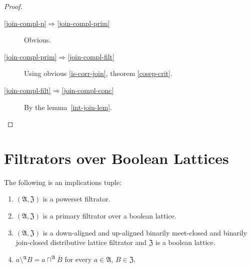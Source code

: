 \begin{proof}
~
\begin{description}
\item [{\ref{join-compl-p}$\Rightarrow$\ref{join-compl-prim}}] Obvious.
\item [{\ref{join-compl-prim}$\Rightarrow$\ref{join-compl-filt}}] Using
obvious \ref{is-corr-join}, theorem \ref{cosep-crit}.
\item [{\ref{join-compl-filt}$\Rightarrow$\ref{join-compl-conc}}] By
the lemma~\ref{int-join-lem}.
\end{description}
\end{proof}

\section{Filtrators over Boolean Lattices}
\begin{prop}
\label{b-bool-minus}The following is an implications tuple:
\begin{enumerate}
\item \label{bool-minus-p}$(\mathfrak{A},\mathfrak{Z})$ is a powerset
filtrator.
\item \label{bool-minus-f}$(\mathfrak{A},\mathfrak{Z})$ is a primary filtrator
over a boolean lattice.
\item \label{bool-minus-fltr}$(\mathfrak{A},\mathfrak{Z})$ is a down-aligned
and up-aligned binarily meet-closed and binarily join-closed distributive
lattice filtrator and $\mathfrak{Z}$ is a boolean lattice.
\item \label{bool-minus-conc}$a\setminus{}^{\mathfrak{A}}B=a\sqcap^{\mathfrak{A}}\overline{B}$
for every $a\in\mathfrak{A}$, $B\in\mathfrak{Z}$.
\end{enumerate}
\end{prop}
